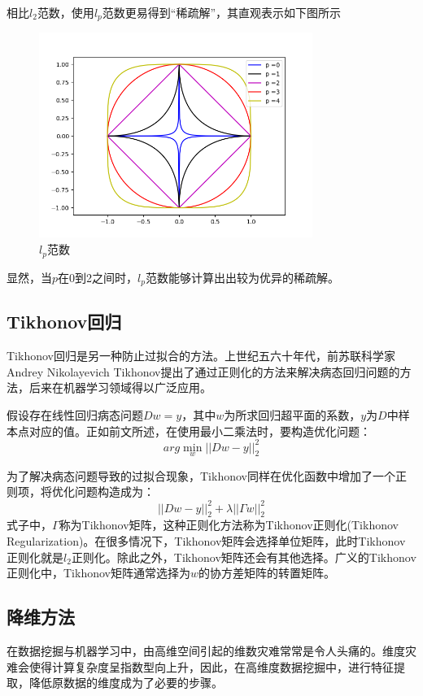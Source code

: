 \documentclass[12pt,a4paper]{article}
\begin{document}
相比$l_{2}$范数，使用$l_{p}$范数更易得到“稀疏解”，其直观表示如下图所示

\begin{figure}[H] 
\center
\includegraphics[width=3.5in]{lp_norm.png} 
\caption{$l_{p}$范数}\label{fig:1} 
\end{figure} 

显然，当$p$在0到2之间时，$l_{p}$范数能够计算出出较为优异的稀疏解。


\subsection{Tikhonov回归}
Tikhonov回归是另一种防止过拟合的方法。上世纪五六十年代，前苏联科学家Andrey Nikolayevich Tikhonov提出了通过正则化的方法来解决病态回归问题的方法，后来在机器学习领域得以广泛应用。

假设存在线性回归病态问题$Dw = y$，其中$w$为所求回归超平面的系数，$y$为$D$中样本点对应的值。正如前文所述，在使用最小二乘法时，要构造优化问题：
\begin{equation*}
arg\min_{w} ||Dw - y||_{2}^{2}
\end{equation*}

为了解决病态问题导致的过拟合现象，Tikhonov同样在优化函数中增加了一个正则项，将优化问题构造成为：
\begin{equation*}
||Dw - y||_{2}^{2} + \lambda ||\Gamma w||_{2}^{2}
\end{equation*}
式子中，$\Gamma$称为Tikhonov矩阵，这种正则化方法称为Tikhonov正则化(Tikhonov Regularization)。在很多情况下，Tikhonov矩阵会选择单位矩阵，此时Tikhonov正则化就是$l_{2}$正则化。除此之外，Tikhonov矩阵还会有其他选择。广义的Tikhonov正则化中，Tikhonov矩阵通常选择为$w$的协方差矩阵的转置矩阵。

\subsection{降维方法}
在数据挖掘与机器学习中，由高维空间引起的维数灾难常常是令人头痛的。维度灾难会使得计算复杂度呈指数型向上升，因此，在高维度数据挖掘中，进行特征提取，降低原数据的维度成为了必要的步骤。
\end{document}
